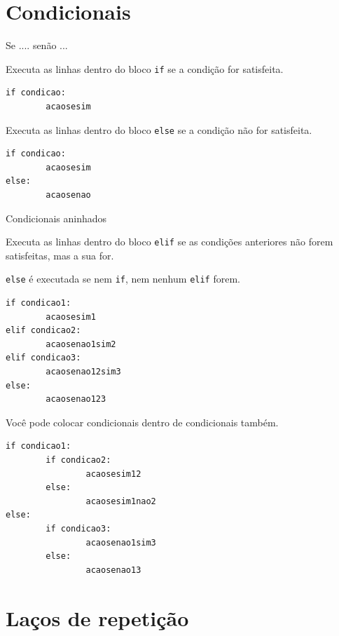 \section{Condicionais} 
\begin{frame}[containsverbatim]{Se .... senão ...}
	
	Executa as linhas dentro do bloco \texttt{if} se a condição for satisfeita.	
	
	\begin{verbatim}
if condicao:
		acaosesim
	\end{verbatim}
	
	\vfill

	Executa as linhas dentro do bloco \texttt{else} se a condição não for satisfeita.	

\begin{verbatim}
if condicao:
		acaosesim
else:	
		acaosenao
\end{verbatim}	
  \end{frame}
  
\begin{frame}[containsverbatim]{Condicionais aninhados}  			
	
	Executa as linhas dentro do bloco \texttt{elif} se as condições anteriores não forem satisfeitas, mas a sua for.	
	
	\texttt{else} é executada se nem \texttt{if}, nem nenhum \texttt{elif} forem.
	
	\begin{verbatim}
if condicao1:
		acaosesim1
elif condicao2:	
		acaosenao1sim2
elif condicao3:
		acaosenao12sim3	
else:	
		acaosenao123
	\end{verbatim}
\end{frame}	
\begin{frame}[containsverbatim]%

	Você pode colocar condicionais dentro de condicionais também.
	
	\begin{verbatim}
if condicao1:
		if condicao2:
				acaosesim12
		else:	
				acaosesim1nao2
else:	
		if condicao3: 
				acaosenao1sim3
		else:	
				acaosenao13
	\end{verbatim}
  \end{frame}

\section{Laços de repetição}

